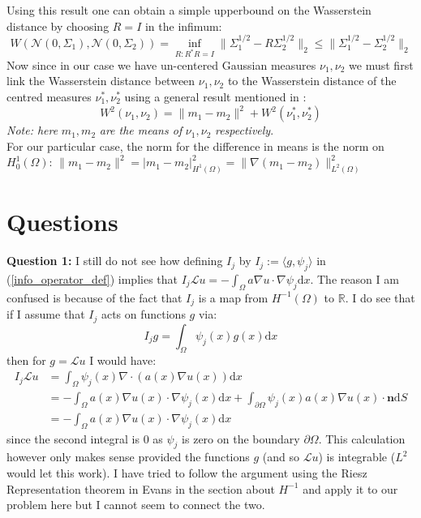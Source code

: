 \documentclass{article}
\theoremstyle{definition}
\theoremstyle{remark}
\begin{document}
Using this result one can obtain a simple upperbound on the Wasserstein distance by choosing $R=I$ in the infimum:
\begin{equation*}
    W(\mathcal{N}(0,\Sigma_1),\mathcal{N}(0,\Sigma_2))=\inf_{R:R^{*}R=I}\|\Sigma_{1}^{1/2}-R\Sigma_{2}^{1/2}\|_{2} \leq \|\Sigma_{1}^{1/2}-\Sigma_{2}^{1/2}\|_{2}
\end{equation*}
Now since in our case we have un-centered Gaussian measures $\nu_{1},\nu_{2}$ we must first link the Wasserstein distance between $\nu_1,\nu_2$ to the Wasserstein distance of the centred measures $\nu_{1}^{*},\nu_{2}^{*}$ using a general result mentioned in \cite{cuesta1996lower}:
\begin{equation*}
    W^2(\nu_{1},\nu_{2})=\|m_1-m_2\|^{2}+W^{2}(\nu_{1}^*,\nu_{2}^{*})
\end{equation*}
\textit{Note: here} $m_1,m_2$ \textit{are the means of} $\nu_{1},\nu_{2}$ \textit{respectively}. \\

For our particular case, the norm for the difference in means is the norm on $H_{0}^{1}(\Omega)$: $\|m_1-m_2\|^{2}=|m_1-m_2|_{H^1(\Omega)}^{2}=\|\nabla(m_1-m_2)\|_{L^2(\Omega)}^{2}$






\clearpage
\section{Questions}

\noindent \textbf{Question 1:} I still do not see how defining $I_j$ by $I_j:=\langle g, \psi_j \rangle$ in (\ref{info_operator_def}) implies that $I_{j}\mathcal{L}u=-\int_{\Omega}a\nabla u \cdot \nabla\psi_{j}\mathrm{d}x$. The reason I am confused is because of the fact that $I_j$ is a map from $H^{-1}(\Omega)$ to $\mathbb{R}$. I do see that if I assume that $I_{j}$ acts on functions $g$ via:
\begin{equation*}
    I_{j}g=\int_{\Omega}\psi_{j}(x)g(x)\mathrm{d}x
\end{equation*}
then for $g=\mathcal{L}u$ I would have:
\begin{align*}
    I_{j}\mathcal{L}u&=\int_{\Omega}\psi_{j}(x)\nabla\cdot(a(x)\nabla u(x))\mathrm{d}x \\
    &=-\int_{\Omega}a(x)\nabla u(x)\cdot\nabla\psi_{j}(x)\mathrm{d}x + \int_{\partial\Omega}\psi_{j}(x)a(x)\nabla u(x)\cdot\mathbf{n}\mathrm{d}S \\
    &=-\int_{\Omega}a(x)\nabla u(x)\cdot\nabla\psi_{j}(x)\mathrm{d}x
\end{align*}
since the second integral is $0$ as $\psi_j$ is zero on the boundary $\partial\Omega$. This calculation however only makes sense provided the functions $g$ (and so $\mathcal{L}u$) is integrable ($L^2$ would let this work). I have tried to follow the argument using the Riesz Representation theorem in Evans in the section about $H^{-1}$ and apply it to our problem here but I cannot seem to connect the two. \\
\end{document}
